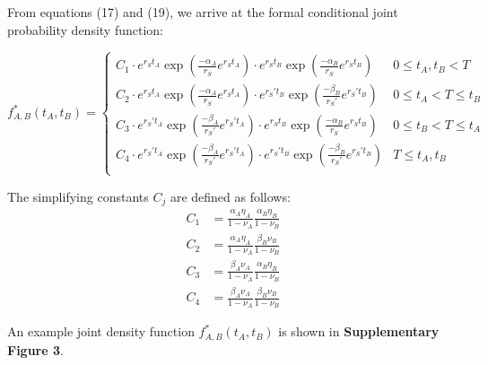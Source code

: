 \documentclass{article}
\begin{document}
From equations (17) and (19), we arrive at the formal conditional joint probability density function:


\begin{equation}
f_{A,B}^*(t_A,t_B)=\begin{cases}
		C_1\cdot e^{r_S t_A} \exp(\frac{-\alpha_A}{r_S} e^{r_S t_A}) \cdot e^{r_S t_B} \exp(\frac{-\alpha_B}{r_S} e^{r_S t_B}) & 0\leq t_A,t_B<T \\
		C_2\cdot e^{r_S t_A} \exp(\frac{-\alpha_A}{r_S} e^{r_S t_A}) \cdot e^{r_S' t_B} \exp(\frac{-\beta_B}{r_S'} e^{r_S' t_B}) & 0\leq t_A<T \leq t_B \\
		C_3\cdot e^{r_S' t_A} \exp(\frac{-\beta_A}{r_S'} e^{r_S' t_A}) \cdot e^{r_S t_B} \exp(\frac{-\alpha_B}{r_S} e^{r_S t_B}) & 0\leq t_B<T \leq t_A \\
		C_4\cdot e^{r_S' t_A} \exp(\frac{-\beta_A}{r_S'} e^{r_S' t_A}) \cdot e^{r_S' t_B} \exp(\frac{-\beta_B}{r_S'} e^{r_S' t_B}) & T\leq t_A,t_B \\ 
       \end{cases}
\end{equation}

The simplifying constants $C_j$ are defined as follows:
\begin{equation}
\begin{split}
C_1 &= \frac{\alpha_A \eta_A}{1-\nu_A}\frac{\alpha_B \eta_B}{1-\nu_B} \\
C_2 &= \frac{\alpha_A \eta_A}{1-\nu_A}\frac{\beta_B \nu_B}{1-\nu_B} \\
C_3 &= \frac{\beta_A \nu_A}{1-\nu_A}\frac{\alpha_B \eta_B}{1-\nu_B} \\
C_4 &= \frac{\beta_A \nu_A}{1-\nu_A}\frac{\beta_B \nu_B}{1-\nu_B}
\end{split}
\end{equation}

An example joint density function $f_{A,B}^*(t_{A},t_{B})$ is shown in \textbf{Supplementary Figure 3}.
\end{document}
